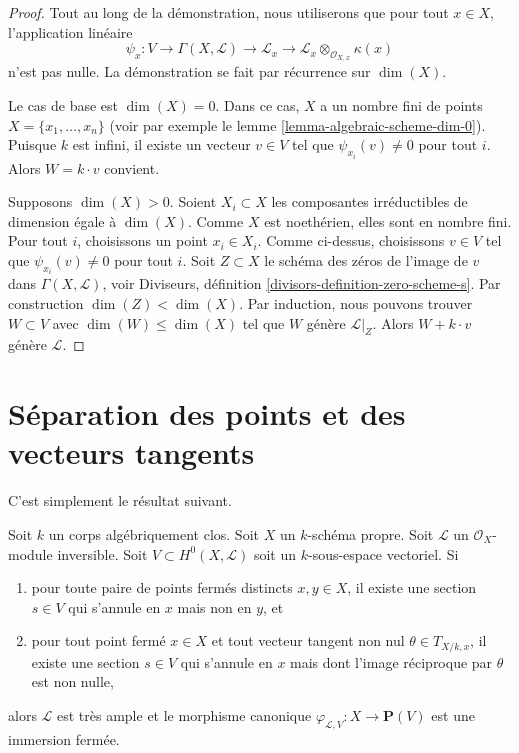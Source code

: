 \begin{proof}
Tout au long de la démonstration, nous utiliserons
que pour tout $x \in X$, l'application linéaire
$$
\psi_x : V \to \Gamma(X, \mathcal{L}) \to \mathcal{L}_x \to
\mathcal{L}_x \otimes_{\mathcal{O}_{X, x}} \kappa(x)
$$
n'est pas nulle. La démonstration se fait par récurrence sur $\dim(X)$.

\medskip\noindent
Le cas de base est $\dim(X) = 0$. Dans ce cas, $X$ a un
nombre fini de points $X = \{x_1, \ldots, x_n\}$ (voir par
exemple le lemme \ref{lemma-algebraic-scheme-dim-0}). Puisque
$k$ est infini, il existe un vecteur $v \in V$ tel que
$\psi_{x_i}(v) \not = 0$ pour tout $i$. Alors $W = k\cdot v$ convient.

\medskip\noindent
Supposons $\dim(X) > 0$. Soient $X_i \subset X$ les composantes
irréductibles de dimension égale à $\dim(X)$. Comme $X$
est noethérien, elles sont en nombre fini. Pour tout $i$,
choisissons un point $x_i \in X_i$. Comme ci-dessus, choisissons $v
\in V$ tel que $\psi_{x_i}(v) \not = 0$ pour tout $i$. Soit
$Z \subset X$ le schéma des zéros de l'image de $v$ dans $\Gamma(X,
\mathcal{L})$, voir Diviseurs, définition
\ref{divisors-definition-zero-scheme-s}. Par construction $\dim(Z) < \dim(X)$.
Par induction, nous pouvons trouver $W \subset V$ avec $\dim(W) \leq \dim(X)$
tel que $W$ génère $\mathcal{L}|_Z$. Alors $W + k\cdot v$ génère $\mathcal{L}$.
\end{proof}






\section{Séparation des points et des vecteurs tangents}
\label{section-separating-points-tangent-vectors}

\noindent
C'est simplement le résultat suivant.

\begin{lemma}
\label{lemma-separate-points-tangent-vectors}
Soit $k$ un corps algébriquement clos. Soit
$X$ un $k$-schéma propre. Soit $\mathcal{L}$
un $\mathcal{O}_X$-module inversible. Soit $V
\subset H^0(X, \mathcal{L})$ soit un $k$-sous-espace vectoriel. Si
\begin{enumerate}
\item pour toute paire de points fermés distincts $x, y \in X$, il
existe une section $s \in V$ qui s'annule en $x$ mais non en $y$, et
\item pour tout point fermé $x \in X$ et tout vecteur tangent non
nul $\theta \in T_{X/k, x}$, il existe une section $s \in V$ qui
s'annule en $x$ mais dont l'image réciproque par $\theta$ est non nulle,
\end{enumerate}
alors $\mathcal{L}$ est très ample et le
morphisme canonique $\varphi_{\mathcal{L}, V} :
X \to \mathbf{P}(V)$ est une immersion fermée.
\end{lemma}

